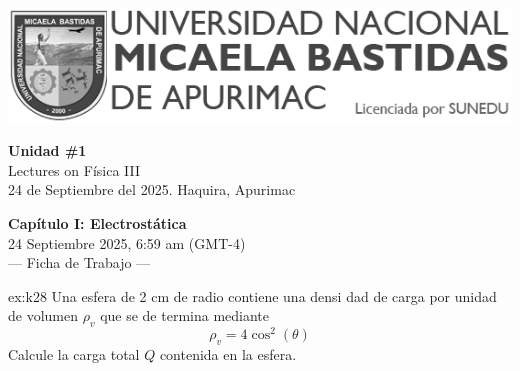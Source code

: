 


\begin{minipage}[l]{0.42\textwidth}
    \includegraphics[width=1\textwidth]{img/logo-UNAMBA.png}
\end{minipage}
\hfill
\begin{minipage}[c]{0.5\textwidth}
    \begin{flushright}
	\large{\textbf{Unidad \#1}}\\
	\large{Lectures on Física III}\\
	\large{24 de Septiembre del 2025. Haquira, Apurimac}\\
    \end{flushright}
\end{minipage}


  
 \begin{multicols}{2}
   \begin{center}
         \LARGE{\textbf{Capítulo I: Electrostática}}\\	
         \vspace{0.2cm}
         \large{24 Septiembre 2025, 6:59 am (GMT-4)}\\
         \large{— Ficha de Trabajo —}
     \end{center}
    \begin{excercise}[][][$Q=44.68\, \rm{\mu C}$]{ex:k28}{
        Una esfera de 2 cm de radio contiene una densi
        dad de carga por unidad de volumen $\rho_v$ que se de
        termina mediante 
        \begin{equation}
            \rho_v=4\cos^2(\theta)
        \end{equation}
         Calcule la carga total $Q$ contenida en la esfera.
         }
    \end{excercise}


\end{multicols}
